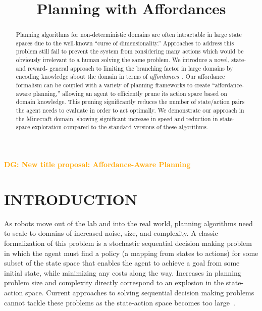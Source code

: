 \documentclass[]{article}
\title{Planning with Affordances}
\newcommand{\stnote}[1]{\textcolor{Blue}{\textbf{ST: #1}}}
\newcommand{\dgnote}[1]{\textcolor{Orange}{\textbf{DG: #1}}}
\begin{document}
\author{}
\maketitle

\dgnote{New title proposal: Affordance-Aware Planning}

\begin{abstract}

Planning algorithms for non-deterministic domains are often
intractable in large state spaces due to the well-known
``curse of dimensionality.''  Approaches to address this problem still fail to
prevent the system from considering many actions which would be
obviously irrelevant to a human solving the same problem.  We
introduce a novel, state- and reward- general approach to limiting the
branching factor in large domains by encoding knowledge about the
domain in terms of {\em affordances}~\citep{gibson77}.  Our affordance
formalism can be coupled with a variety of planning frameworks to
create ``affordance-aware planning,'' allowing an agent to efficiently
prune its action space based on domain knowledge.  This pruning
significantly reduces the number of state/action pairs the agent needs
to evaluate in order to act optimally. We demonstrate our approach in
the Minecraft domain, showing significant increase in speed and
reduction in state-space exploration compared to the standard versions
of these algorithms.

\end{abstract}


\section{INTRODUCTION}

As robots move out of the lab and into the real world, planning
algorithms need to scale to domains of increased noise, size, and
complexity.  A classic formalization of this problem is a stochastic
sequential decision making problem in which the agent must find a
policy (a mapping from states to actions) for some subset of the state
space that enables the agent to achieve a goal from some initial
state, while minimizing any costs along the way.
Increases in planning problem size
and complexity directly correspond to an explosion in the state-action
space. Current approaches to solving sequential decision making
problems cannot tackle these problems as the state-action space
becomes too large~\citep{grounds05}.
\end{document}

